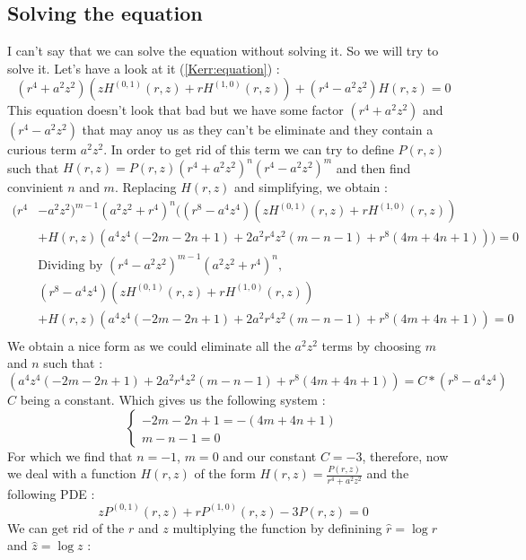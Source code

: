 \documentclass[a4paper,12pt]{article}
\theoremstyle{definition}
\begin{document}
\subsection{Solving the equation}
I can't say that we can solve the equation without solving it.
So we will try to solve it.
Let's have a look at it (\ref{Kerr:equation}) :
\begin{equation}
	(r^4+a^2z^2)(z H^{(0,1)}(r,z)+rH^{(1,0)}(r,z))+(r^4-a^2 z^2) H(r,z)=0
\end{equation}
This equation doesn't look that bad but we have some factor $(r^4+a^2z^2)$ and $(r^4-a^2 z^2)$ that may anoy us as they can't be eliminate and they contain a curious term $a^2z^2$.
In order to get rid of this term we can try to define $P(r,z)$ such that $H(r,z)=P(r,z)(r^4+a^2z^2)^n(r^4-a^2 z^2)^m$ and then find convinient $n$ and $m$.
Replacing $H(r,z)$ and simplifying, we obtain :
\begin{align}
   (r^4&-a^2 z^2)^{m-1} (a^2z^2+r^4)^n((r^8-a^4 z^4)(z H^{(0,1)}(r,z)+r H^{(1,0)}(r,z))\\
   &+H(r,z)(a^4 z^4 (-2 m-2 n+1)+2 a^2 r^4 z^2 (m-n-1)+r^8(4 m+4 n+1)))=0\\
   &\text{Dividing by }(r^4-a^2 z^2)^{m-1} (a^2z^2+r^4)^n,\\
   &(r^8-a^4 z^4)(z H^{(0,1)}(r,z)+r H^{(1,0)}(r,z))\\
   &+H(r,z)(a^4 z^4 (-2 m-2 n+1)+2 a^2 r^4 z^2 (m-n-1)+r^8(4 m+4 n+1))=0\\
\end{align}
We obtain a nice form as we could eliminate all the $a^2z^2$ terms by choosing $m$ and $n$ such that :
\begin{equation}
	(a^4 z^4 (-2 m-2 n+1)+2 a^2 r^4 z^2 (m-n-1)+r^8(4 m+4 n+1))=C*(r^8-a^4 z^4)
\end{equation}
$C$ being a constant. Which gives us the following system :
\begin{equation}
\begin{cases} -2 m-2 n+1=- (4 m+4 n+1)\\ m-n-1=0 \end{cases}
\end{equation}
For which we find that $n=-1$, $m=0$ and our constant $C=-3$, therefore, now we deal with a function $H(r,z)$ of the form $H(r,z)=\frac{P(r,z)}{r^4+a^2z^2}$ and the following PDE :
\begin{equation}\label{P:Eq}
	z P^{(0,1)}(r,z)+r P^{(1,0)}(r,z)-3P(r,z)=0
\end{equation}
We can get rid of the $r$ and $z$ multiplying the function by definining $\hat{r}=\log{r}$ and $\hat{z}=\log{z}$ :
\end{document}
